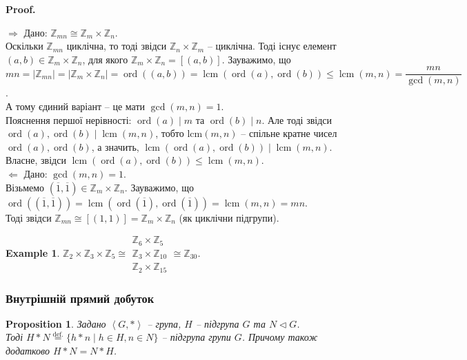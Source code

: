 \documentclass[a4paper, 10pt]{article}
\makeatletter
\def\rightproof{$\boxed{\Rightarrow}$ }
\def\leftproof{$\boxed{\Leftarrow}$ }
\theoremstyle{theoremdd}
\theoremstyle{theoremdd}
\theoremstyle{theoremdd}
\theoremstyle{theoremdd}
\theoremstyle{theoremdd}
\newtheorem{example}[theorem]{Example}
\theoremstyle{theoremdd}
\theoremstyle{theoremdd}
\theoremstyle{theoremdd}
\theoremstyle{theoremdd}
\newtheorem{proposition}[theorem]{Proposition}
\theoremstyle{theoremdd}
\theoremstyle{theoremdd}
\theoremstyle{theoremdd}
\theoremstyle{theoremdd}
\theoremstyle{theoremdd}
\theoremstyle{theoremdd}
\renewenvironment{proof}[1][Proof.\\]{\par
\pushQED{\hfill \qed}%
\normalfont \topsep6\p@\@plus6\p@\relax
\trivlist
\item\relax
{\bfseries
#1\@addpunct{.}}\hspace\labelsep\ignorespaces
}{%
\popQED\endtrivlist\@endpefalse
}
\DeclareMathOperator{\ord}{ord}
\DeclareMathOperator{\lcm}{lcm}
\newcommand{\eqbydef}{\overset{\text{def.}}{=}}
\makeatother
\begin{document}
\begin{proof}
\rightproof Дано: $\mathbb{Z}_{mn} \cong \mathbb{Z}_m \times \mathbb{Z}_n$.\\ Оскільки $\mathbb{Z}_{mn}$ циклічна, то тоді звідси $\mathbb{Z}_n \times \mathbb{Z}_m$ -- циклічна. Тоді існує елемент $(a,b) \in \mathbb{Z}_m \times \mathbb{Z}_n$, для якого $\mathbb{Z}_m \times \mathbb{Z}_n = [(a,b)]$. Зауважимо, що \\
$mn = |\mathbb{Z}_{mn}| = |\mathbb{Z}_m \times \mathbb{Z}_n| = \ord((a,b)) = \lcm(\ord(a),\ord(b)) \leq \lcm(m,n) = \dfrac{mn}{\gcd(m,n)}$.\\
А тому єдиний варіант -- це мати $\gcd(m,n) = 1$.\\
Пояснення першої нерівності: $\ord(a) \mid m$ та $\ord(b) \mid n$. Але тоді звідси $\ord(a), \ord(b) \mid \lcm(m,n)$, тобто $\text{lcm}(m,n)$ -- спільне кратне чисел $\ord(a),\ord(b)$, а значить, $\lcm(\ord(a),\ord(b)) \mid \lcm(m,n)$. Власне, звідси $\lcm(\ord(a),\ord(b)) \leq \lcm(m,n)$.
\bigskip \\
\leftproof Дано: $\gcd(m,n) = 1$.\\
Візьмемо $(\overline{1},\overline{1}) \in \mathbb{Z}_m \times \mathbb{Z}_n$. Зауважимо, що $\ord((\overline{1},\overline{1})) = \lcm(\ord(\overline{1}),\ord(\overline{1})) = \lcm(m,n) = mn$.\\
Тоді звідси $\mathbb{Z}_{mn} \cong [(1,1)] = \mathbb{Z}_m \times \mathbb{Z}_n $ (як циклічни підгрупи).
\end{proof}

\begin{example}
$\mathbb{Z}_{2} \times \mathbb{Z}_3 \times \mathbb{Z}_5 \cong \begin{gathered} \mathbb{Z}_6 \times \mathbb{Z}_5 \\ \mathbb{Z}_3 \times \mathbb{Z}_{10} \\ \mathbb{Z}_{2} \times \mathbb{Z}_{15} \end{gathered} \cong \mathbb{Z}_{30}$.
\end{example}

\subsubsection{Внутрішній прямий добуток}
\begin{proposition}
Задано $\left<G,*\right>$ -- група, $H$ -- підгрупа $G$ та $N \triangleleft G$.\\
Тоді $H*N \eqbydef \{ h*n \mid h \in H, n \in N \}$ -- підгрупа групи $G$. Причому також додатково $H*N = N*H$.
\end{proposition}
\end{document}
